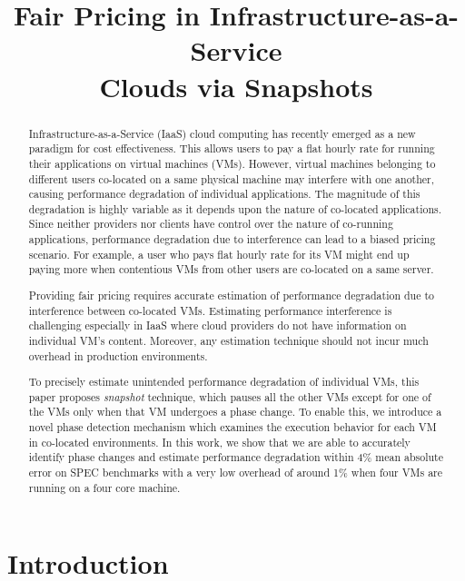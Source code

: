 \documentclass{sig-alternate}
\date{}
\begin{document}
\thispagestyle{firstpage}
\pagestyle{plain}


\title{Fair Pricing in Infrastructure-as-a-Service \\ Clouds via Snapshots}
\maketitle

\begin{abstract}

Infrastructure-as-a-Service (IaaS) cloud computing has recently emerged as a new paradigm for cost effectiveness. This allows users to pay a flat hourly rate for running their applications on virtual machines (VMs). However, virtual machines belonging to different users co-located on a same physical machine may interfere with one another, causing performance degradation of individual applications. The magnitude of this degradation is highly variable as it depends upon the nature of co-located applications. Since neither providers nor clients have control over the nature of co-running applications, performance degradation due to interference can lead to a biased pricing scenario. For example, a user who pays flat hourly rate for its VM might end up paying more when contentious VMs from other users are co-located on a same server.

Providing fair pricing requires accurate estimation of performance degradation due to interference between co-located VMs. Estimating performance interference is challenging especially in IaaS where cloud providers do not have information on individual VM's content. Moreover, any estimation technique should not incur much overhead in production environments.

To precisely estimate unintended performance degradation of individual VMs, this paper proposes \textit{snapshot} technique, which pauses all the other VMs except for one of the VMs only when that VM undergoes a phase change. To enable this, we introduce a novel phase detection mechanism which examines the execution behavior for each VM in co-located environments.  In this work, we show that we are able to accurately identify phase changes and estimate performance degradation within 4\% mean absolute error on SPEC benchmarks with a very low overhead of around 1\% when four VMs are running on a four core machine.

\end{abstract}
\section{Introduction}
\label{sec:Introduction}
\end{document}
